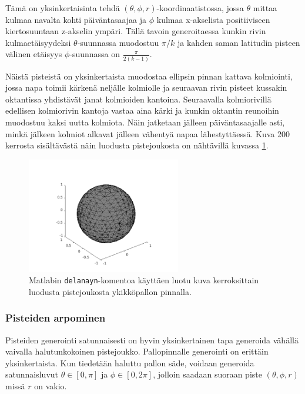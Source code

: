 \documentclass[12pt,a4paper,titlepage]{article}
\begin{document}
Tämä on yksinkertaisinta tehdä $(\theta, \phi, r)$-koordinaatistossa, jossa $\theta$ mittaa kulmaa navalta kohti päiväntasaajaa ja $\phi$ kulmaa x-akselista positiiviseen kiertosuuntaan z-akselin ympäri. Tällä tavoin generoitaessa kunkin rivin kulmaetäisyydeksi $\theta$-suunnassa muodostuu $\pi/k$ ja kahden saman latitudin pisteen välinen etäisyys $\phi$-suunnassa on $\frac{\pi}{2(k-1)}$.

Näistä pisteistä on yksinkertaista muodostaa ellipsin pinnan kattava kolmiointi, jossa napa toimii kärkenä neljälle kolmiolle ja seuraavan rivin pisteet kussakin oktantissa yhdistävät janat kolmioiden kantoina. Seuraavalla kolmiorivillä edellisen kolmiorivin kantoja vastaa aina kärki ja kunkin oktantin reunoihin muodostuu kaksi uutta kolmiota. Näin jatketaan jälleen päiväntasaajalle asti, minkä jälkeen kolmiot alkavat jälleen vähentyä napaa lähestyttäessä. Kuva 200 kerrosta sisältävästä näin luodusta pistejoukosta on nähtävillä kuvassa \ref{murrikolmiointi}.

\begin{figure}
  \centering
  \includegraphics[width=0.6\textwidth]{../Delaunay/data/murrikolmiot/pallo.png}
  \caption{Matlabin \texttt{delanayn}-komentoa käyttäen luotu kuva kerroksittain luodusta pistejoukosta ykikköpallon pinnalla.}
  \label{murrikolmiointi}
\end{figure}

\subsubsection{Pisteiden arpominen}
Pisteiden generointi satunnaisesti on hyvin yksinkertainen tapa generoida vähällä vaivalla halutunkokoinen pistejoukko. Pallopinnalle generointi on erittäin yksinkertaista. Kun tiedetään haluttu pallon säde, voidaan generoida satunnaisluvut $\theta \in [0, \pi]$ ja $\phi \in [0, 2\pi]$, jolloin saadaan suoraan piste $(\theta, \phi, r)$ missä $r$ on vakio.
\end{document}
